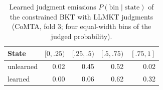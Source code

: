 \begin{table}[t]
\centering
\small
\caption{Learned judgment emissions $P(\text{bin}\mid\text{state})$ of the constrained BKT with LLMKT judgments (CoMTA, fold 3; four equal-width bins of the judged probability).}
\label{tab:emissions}
\begin{tabular}{lrrrr}
\toprule
State & $[0,.25)$ & $[.25,.5)$ & $[.5,.75)$ & $[.75,1]$ \\
\midrule
unlearned & 0.02 & 0.45 & 0.52 & 0.02 \\
learned & 0.00 & 0.06 & 0.62 & 0.32 \\
\bottomrule
\end{tabular}
\end{table}
